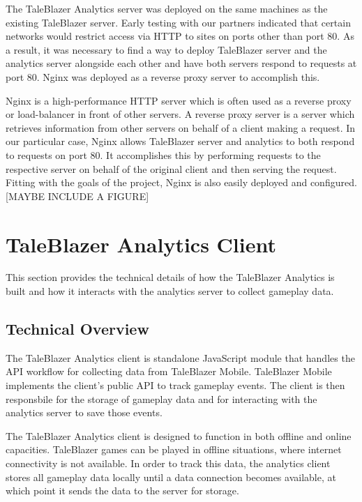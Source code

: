 The TaleBlazer Analytics server was deployed on the same machines as the existing TaleBlazer server. Early testing with our partners indicated that certain networks would restrict access via HTTP to sites on ports other than port 80. As a result, it was necessary to find a way to deploy TaleBlazer server and the analytics server alongside each other and have both servers respond to requests at port 80. Nginx was deployed as a reverse proxy server to accomplish this. 

Nginx is a high-performance HTTP server which is often used as a reverse proxy or load-balancer in front of other servers. A reverse proxy server is a server which retrieves information from other servers on behalf of a client making a request. In our particular case, Nginx allows TaleBlazer server and analytics to both respond to requests on port 80. It accomplishes this by performing requests to the respective server on behalf of the original client and then serving the request. Fitting with the goals of the project, Nginx is also easily deployed and configured. [MAYBE INCLUDE A FIGURE]





\section{TaleBlazer Analytics Client}

This section provides the technical details of how the TaleBlazer Analytics is built and how it interacts with the analytics server to collect gameplay data. 

\subsection{Technical Overview}

The TaleBlazer Analytics client is standalone JavaScript module that handles the API workflow for collecting data from TaleBlazer Mobile. TaleBlazer Mobile implements the client's public API to track gameplay events. The client is then responsbile for the storage of gameplay data and for interacting with the analytics server to save those events. 

The TaleBlazer Analytics client is designed to function in both offline and online capacities. TaleBlazer games can be played in offline situations, where internet connectivity is not available. In order to track this data, the analytics client stores all gameplay data locally until a data connection becomes available, at which point it sends the data to the server for storage.

